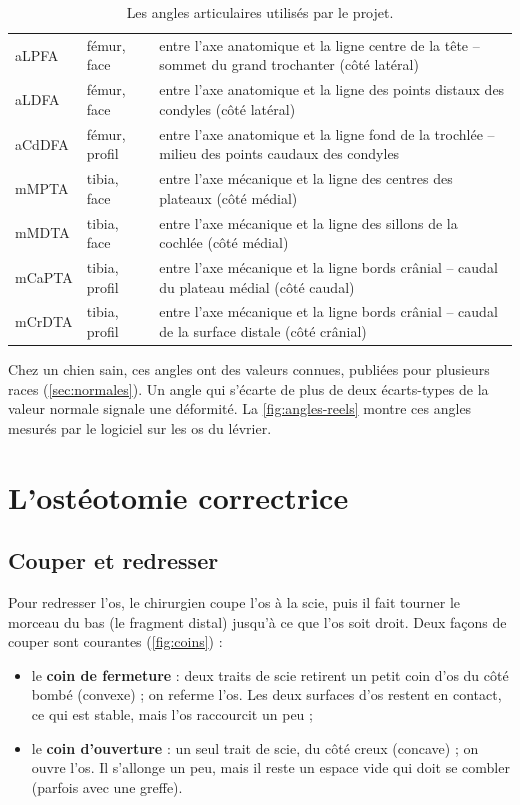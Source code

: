 \begin{table}[htbp]
\centering\small
\caption{Les angles articulaires utilisés par le projet.}
\label{tab:angles}
\begin{tabularx}{\linewidth}{lL{1.6cm}Y}
\toprule
{} &  &  \\
\midrule
aLPFA & fémur, face & entre l'axe anatomique et la ligne centre de la tête -- sommet du grand trochanter (côté latéral) \\
aLDFA & fémur, face & entre l'axe anatomique et la ligne des points distaux des condyles (côté latéral) \\
aCdDFA & fémur, profil & entre l'axe anatomique et la ligne fond de la trochlée -- milieu des points caudaux des condyles \\
mMPTA & tibia, face & entre l'axe mécanique et la ligne des centres des plateaux (côté médial) \\
mMDTA & tibia, face & entre l'axe mécanique et la ligne des sillons de la cochlée (côté médial) \\
mCaPTA & tibia, profil & entre l'axe mécanique et la ligne bords crânial -- caudal du plateau médial (côté caudal) \\
mCrDTA & tibia, profil & entre l'axe mécanique et la ligne bords crânial -- caudal de la surface distale (côté crânial) \\
\bottomrule
\end{tabularx}
\end{table}

Chez un chien sain, ces angles ont des valeurs connues, publiées pour plusieurs races (\cref{sec:normales}). Un angle
qui s'écarte de plus de deux écarts-types de la valeur normale signale une déformité. La \cref{fig:angles-reels}
montre ces angles mesurés par le logiciel sur les os du lévrier.

\section{L'ostéotomie correctrice}
\label{sec:osteotomie}

\subsection{Couper et redresser}

Pour redresser l'os, le chirurgien coupe l'os à la scie, puis il fait tourner le morceau du bas (le fragment distal)
jusqu'à ce que l'os soit droit. Deux façons de couper sont courantes (\cref{fig:coins}) :
\begin{itemize}
  \item le \textbf{coin de fermeture} : deux traits de scie retirent un petit coin d'os du côté bombé (convexe) ; on
  referme l'os. Les deux surfaces d'os restent en contact, ce qui est stable, mais l'os raccourcit un peu ;
  \item le \textbf{coin d'ouverture} : un seul trait de scie, du côté creux (concave) ; on ouvre l'os. Il s'allonge un
  peu, mais il reste un espace vide qui doit se combler (parfois avec une greffe).
\end{itemize}

